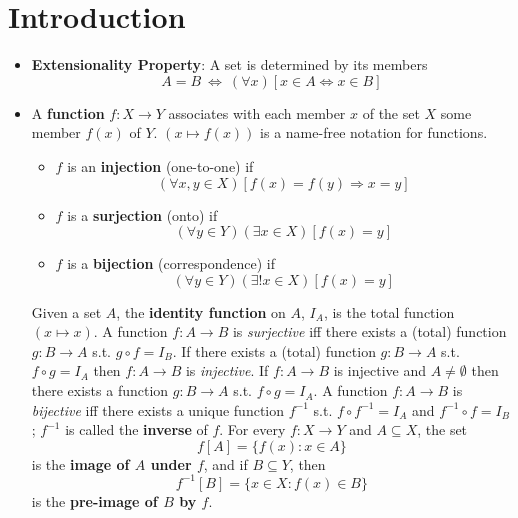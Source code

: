 \documentclass{myproc}
\begin{document}
\small
\pagestyle{empty}


\section{Introduction}
\begin{itemize}
\item {\bf{}Extensionality Property}: A set is determined by its members
	\[ A = B\ \Leftrightarrow\ (\forall{x})[x \in A 
		\Leftrightarrow x \in B] \]
\item A {\bf{}function} $f: X \rightarrow Y$ associates with each member $x$
	of the set $X$ some member $f(x)$ of $Y$. $(x \mapsto f(x))$ is
	a name-free notation for functions.
	\begin{itemize}
	\item $f$ is an {\bf{}injection} (one-to-one) if 
		\[ (\forall{x, y \in X})[f(x) = f(y) \Rightarrow x = y] \]
	\item $f$ is a {\bf{}surjection} (onto) if 
		\[ (\forall{y \in Y})(\exists{x \in X})[f(x) = y] \]
	\item $f$ is a {\bf{}bijection} (correspondence) if
		\[ (\forall{y \in Y})(\exists!{x \in X})[f(x) = y] \]
	\end{itemize}
\w Given a set $A$, the {\bf{}identity function} on $A$, $I_A$, is
	the total function $(x \mapsto x)$.
\w A function $f: A \rightarrow B$ is {\em{}surjective\/} iff there exists a 
	(total) function $g: B \rightarrow A$ s.t.
	$g\circ{f} = I_B$.
\w If there exists a (total) function $g: B \rightarrow A$ s.t. 
	$f\circ{g} = I_A$
	then $f: A \rightarrow B$ is {\em{}injective\/}.
\w If $f: A \rightarrow B$ is injective and $A \ne \emptyset$ then
	there exists a function $g: B \rightarrow A$ s.t. $f\circ{g} = I_A$.
\w A function $f: A \rightarrow B$ is {\em{}bijective\/} iff 
	there exists a unique function $f^{-1}$ s.t. 
	$f\circ{f^{-1}} = I_A$ and $f^{-1}\circ{f} = I_B$; $f^{-1}$ is
	called the {\bf{}inverse} of $f$.
\w For every $f: X \rightarrow Y$ and $A \subseteq X$, the set
	\[f[A] = \{f(x): x \in A\}\]
	is the {\bf{}image of $A$ under $f$}, and if $B \subseteq Y$, then
	\[f^{-1}[B] = \{x \in X: f(x) \in B\}\]
	is the {\bf{}pre-image of $B$ by $f$}.
	
\end{itemize}
\end{document}
